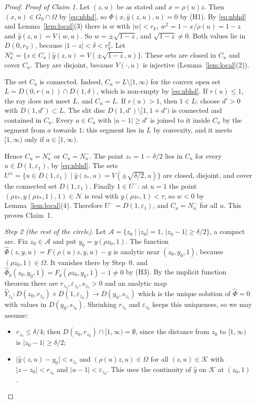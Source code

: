 \documentclass[11pt]{amsart}
\theoremstyle{definition}
\theoremstyle{remark}
\numberwithin{equation}{section}
\newcommand{\cA}{\mathcal{A}}
\newcommand{\cK}{\mathcal{K}}
\newcommand{\cN}{\mathcal{N}}
\newcommand{\abs}[1]{\lvert #1\rvert}
\begin{document}
\begin{proof}
\emph{Proof of Claim 1.} Let \((z,u)\) be as stated and \(x=\rho(u)z\). Then \((x,u)\in G_0\cap\Omega\) by \eqref{eq:nbhd}, so \(\Phi(x,\hat y(z,u),u)=0\) by (H1). By \eqref{eq:nbhd} and Lemma~\ref{lem:local}(3) there is \(w\) with \(\abs{w}<r_V\), \(w^2=1-x/\rho(u)=1-z\) and \(\hat y(z,u)=V(w,u)\). So \(w=\pm\sqrt{1-z}\), and \(\sqrt{1-z}\ne0\). Both values lie in \(D(0,r_V)\), because \(\abs{1-z}<\delta<r_V^2\). Let \(N_u^{\pm}=\{z\in C_u\mid\hat y(z,u)=V(\pm\sqrt{1-z},u)\}\). These sets are closed in \(C_u\) and cover \(C_u\). They are disjoint, because \(V(\cdot,u)\) is injective (Lemma~\ref{lem:local}(2)).

The set \(C_u\) is connected. Indeed, \(C_u=L\setminus[1,\infty)\) for the convex open set \(L=D(0,r(u))\cap D(1,\delta)\), which is non-empty by \eqref{eq:nbhd}. If \(r(u)\le1\), the ray does not meet \(L\), and \(C_u=L\). If \(r(u)>1\), then \(1\in L\); choose \(d'>0\) with \(D(1,d')\subset L\). The slit disc \(D(1,d')\setminus[1,1+d')\) is connected and contained in \(C_u\). Every \(a\in C_u\) with \(\abs{a-1}\ge d'\) is joined to it inside \(C_u\) by the segment from \(a\) towards \(1\): this segment lies in \(L\) by convexity, and it meets \([1,\infty)\) only if \(a\in[1,\infty)\).

Hence \(C_u=N_u^{+}\) or \(C_u=N_u^{-}\). The point \(z_\ast=1-\delta/2\) lies in \(C_u\) for every \(u\in D(1,\varepsilon_1)\), by \eqref{eq:nbhd}. The sets \(U^{\pm}=\{u\in D(1,\varepsilon_1)\mid\hat y(z_\ast,u)=V(\pm\sqrt{\delta/2},u)\}\) are closed, disjoint, and cover the connected set \(D(1,\varepsilon_1)\). Finally \(1\in U^{-}\): at \(u=1\) the point \((\rho z_\ast,y(\rho z_\ast,1),1)\in\cN\) is real with \(y(\rho z_\ast,1)<\tau\), so \(w<0\) by Lemma~\ref{lem:local}(4). Therefore \(U^{-}=D(1,\varepsilon_1)\), and \(C_u=N_u^{-}\) for all \(u\). This proves Claim~1.

\emph{Step 2 (the rest of the circle).} Let \(\cA=\{z_0\mid\abs{z_0}=1,\ \abs{z_0-1}\ge\delta/2\}\), a compact arc. Fix \(z_0\in\cA\) and put \(y_0=y(\rho z_0,1)\). The function \(\hat\Phi(z,y,u)=F(\rho(u)z,y,u)-y\) is analytic near \((z_0,y_0,1)\), because \((\rho z_0,1)\in\Omega\). It vanishes there by Step~0, and \(\hat\Phi_y(z_0,y_0,1)=F_y(\rho z_0,y_0,1)-1\ne0\) by (H3). By the implicit function theorem there are \(r_{z_0},\varepsilon_{z_0},s_{z_0}>0\) and an analytic map \(\hat Y_{z_0}\colon D(z_0,r_{z_0})\times D(1,\varepsilon_{z_0})\to D(y_0,s_{z_0})\) which is the unique solution of \(\hat\Phi=0\) with values in \(D(y_0,s_{z_0})\). Shrinking \(r_{z_0}\) and \(\varepsilon_{z_0}\) keeps this uniqueness, so we may assume:
\begin{itemize}
\item[(i)] \(r_{z_0}\le\delta/4\); then \(D(z_0,r_{z_0})\cap[1,\infty)=\emptyset\), since the distance from \(z_0\) to \([1,\infty)\) is \(\abs{z_0-1}\ge\delta/2\);
\item[(ii)] \(\abs{\hat y(z,u)-y_0}<s_{z_0}\) and \((\rho(u)z,u)\in\Omega\) for all \((z,u)\in\cK\) with \(\abs{z-z_0}<r_{z_0}\) and \(\abs{u-1}<\varepsilon_{z_0}\). This uses the continuity of \(\hat y\) on \(\cK\) at \((z_0,1)\).
\end{itemize}


\end{proof}
\end{document}
